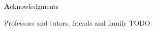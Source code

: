 \clearemptydoublepage
{}
{}

\vspace*{2cm}

\begin{center}
{\Large \textbf Acknowledgments}
\end{center}

\vspace{1cm}

\begin{center}
Professors and tutors, friends and family TODO
\end{center}
